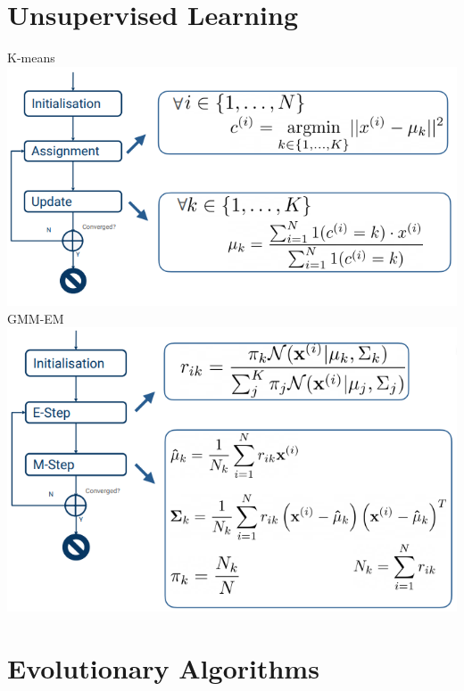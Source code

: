 \documentclass[a4paper, 10pt, twocolumn]{article}
\begin{document}
\section{Unsupervised Learning} 
K-means \\
\includegraphics[scale=0.5]{k-means.png} \\
GMM-EM \\
\includegraphics[scale=0.5]{GMM-EM.png} \\
\section{Evolutionary Algorithms}
\lipsum[5]
\end{document}
